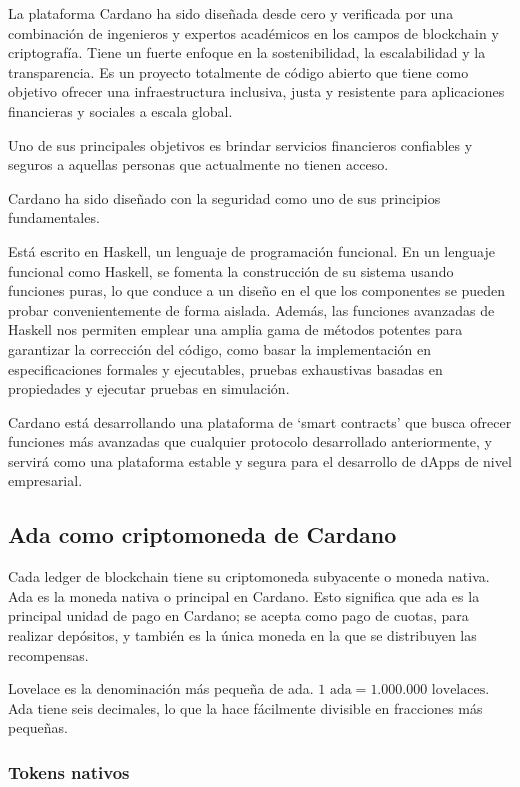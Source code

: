 \documentclass[12pt]{book}
\begin{document}
La plataforma Cardano ha sido diseñada desde cero y verificada por una combinación de ingenieros y expertos académicos en los campos de blockchain y criptografía.
Tiene un fuerte enfoque en la sostenibilidad, la escalabilidad y la transparencia. 
Es un proyecto totalmente de código abierto que tiene como objetivo ofrecer una infraestructura inclusiva, justa y resistente para aplicaciones financieras y sociales a escala global. 

Uno de sus principales objetivos es brindar servicios financieros confiables y seguros a aquellas personas que actualmente no tienen acceso.

Cardano ha sido diseñado con la seguridad como uno de sus principios fundamentales. 

Está escrito en Haskell, un lenguaje de programación funcional. 
En un lenguaje funcional como Haskell, se fomenta la construcción de su sistema usando funciones puras, lo que conduce a un diseño en el que los componentes se pueden probar convenientemente de forma aislada. 
Además, las funciones avanzadas de Haskell nos permiten emplear una amplia gama de métodos potentes para garantizar la corrección del código, como basar la implementación en especificaciones formales y ejecutables, pruebas exhaustivas basadas en propiedades y ejecutar pruebas en simulación.

Cardano está desarrollando una plataforma de `smart contracts' que busca ofrecer funciones más avanzadas que cualquier protocolo desarrollado anteriormente, y servirá como una plataforma estable y segura para el desarrollo de dApps de nivel empresarial.

\subsection{Ada como criptomoneda de Cardano}


Cada ledger de blockchain tiene su criptomoneda subyacente o moneda nativa. Ada es la moneda nativa o principal en Cardano. Esto significa que ada es la principal unidad de pago en Cardano; se acepta como pago de cuotas, para realizar depósitos, y también es la única moneda en la que se distribuyen las recompensas.

Lovelace es la denominación más pequeña de ada. $\boxed{ 1 \text{ ada} = 1.000.000 \text{ lovelaces}}$. Ada tiene seis decimales, lo que la hace fácilmente divisible en fracciones más pequeñas.

\subsubsection{Tokens nativos}
\end{document}
